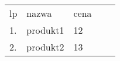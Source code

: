 \begin{tabular}{lllll}
lp & nazwa    & cena &  \\
1. & produkt1 & 12   &  \\
2. & produkt2 & 13   &  \\
\end{tabular}